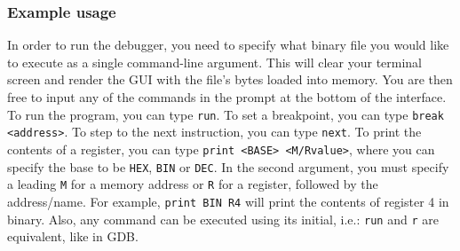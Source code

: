 \documentclass[11pt]{article}
\begin{document}
\subsubsection{Example usage}
In order to run the debugger, you need to specify what binary file you would like to execute as a single command-line argument. This will clear your terminal screen and render the GUI with the file's bytes loaded into memory. You are then free to input any of the commands in the prompt at the bottom of the interface. To run the program, you can type \texttt{run}. To set a breakpoint, you can type \texttt{break <address>}. To step to the next instruction, you can type \texttt{next}. To print the contents of a register, you can type \texttt{print <BASE> <{M/R}value>}, where you can specify the base to be \texttt{HEX}, \texttt{BIN} or \texttt{DEC}. In the second argument, you must specify a leading \texttt{M} for a memory address or \texttt{R} for a register, followed by the address/name. For example, \texttt{print BIN R4} will print the contents of register 4 in binary. Also, any command can be executed using its initial, i.e.: \texttt{run} and \texttt{r} are equivalent, like in GDB.

\newpage
\end{document}
